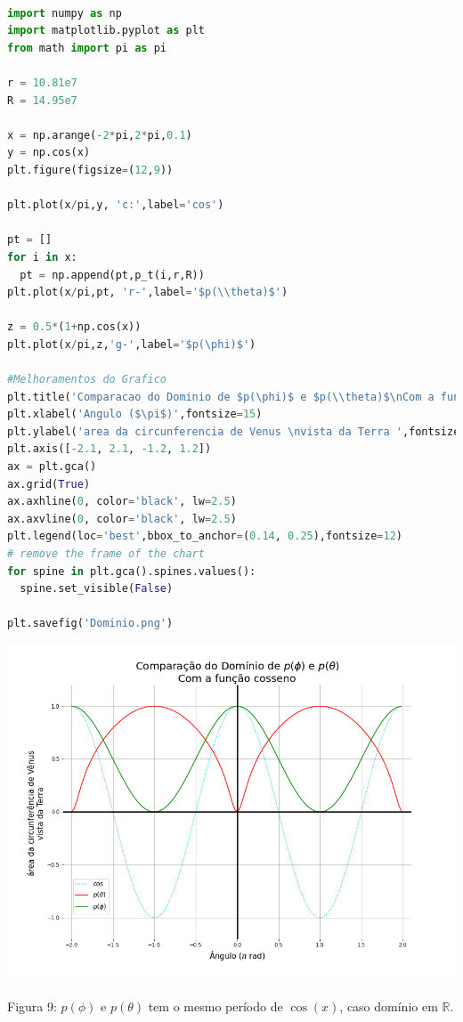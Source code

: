 \documentclass[a4paper, 12pt]{article}
\begin{document}
\begin{lstlisting}[language=Python, caption=Dominio de $\theta$, label=listing_grafico1_mpl] 

import numpy as np
import matplotlib.pyplot as plt
from math import pi as pi

r = 10.81e7
R = 14.95e7

x = np.arange(-2*pi,2*pi,0.1)
y = np.cos(x)
plt.figure(figsize=(12,9))

plt.plot(x/pi,y, 'c:',label='cos')

pt = []
for i in x:
  pt = np.append(pt,p_t(i,r,R))
plt.plot(x/pi,pt, 'r-',label='$p(\\theta)$')

z = 0.5*(1+np.cos(x))
plt.plot(x/pi,z,'g-',label='$p(\phi)$')  

#Melhoramentos do Grafico
plt.title('Comparacao do Dominio de $p(\phi)$ e $p(\\theta)$\nCom a funcao cosseno', fontsize=20)
plt.xlabel('Angulo ($\pi$)',fontsize=15)
plt.ylabel('area da circunferencia de Venus \nvista da Terra ',fontsize=15)
plt.axis([-2.1, 2.1, -1.2, 1.2])
ax = plt.gca()
ax.grid(True)
ax.axhline(0, color='black', lw=2.5)
ax.axvline(0, color='black', lw=2.5)
plt.legend(loc='best',bbox_to_anchor=(0.14, 0.25),fontsize=12)
# remove the frame of the chart
for spine in plt.gca().spines.values():
  spine.set_visible(False) 

plt.savefig('Dominio.png')

\end{lstlisting}

\begin{center}
    \includegraphics[width=16cm]{10-Dominio.png}
    
    Figura 9: $p\left(\phi \right)$ e $p\left(\theta \right)$ tem o mesmo período de $\cos \left(x\right)$, caso domínio em $\mathbb{R}$.
\end{center}
\end{document}
